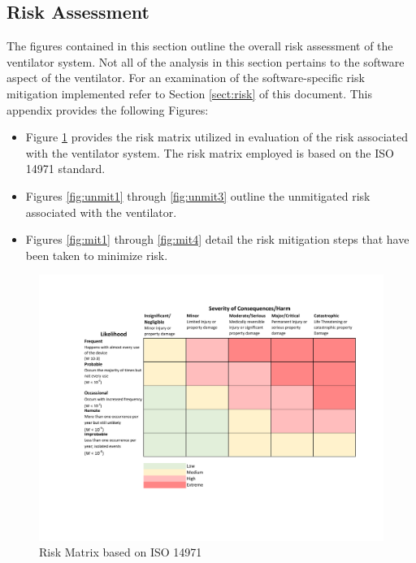 \documentclass[]{article}
\begin{document}
\begin{appendices}
\clearpage
\section{Risk Assessment}
The figures contained in this section outline the overall risk assessment of the ventilator system. Not all of the analysis in this section pertains to the software aspect of the ventilator.  For an examination of the software-specific risk mitigation implemented refer to Section \ref{sect:risk} of this document.
This appendix provides the following Figures:
\begin{itemize}
	\item Figure \ref{fig:risk_matrix} provides the risk matrix utilized in evaluation of the risk associated with the ventilator system.  The risk matrix employed is based on the ISO 14971 standard.
	\item Figures \ref{fig:unmit1} through \ref{fig:unmit3} outline the unmitigated risk associated with the ventilator.
	\item Figures \ref{fig:mit1} through \ref{fig:mit4} detail the risk mitigation steps that have been taken to minimize risk.
\end{itemize}

\begin{figure}
	\includegraphics[scale= 0.9, trim=80 100 40 60, clip]{figures/risk_matrix.pdf}
	\caption{Risk Matrix based on ISO 14971 }
	\label{fig:risk_matrix}
\end{figure}


\end{appendices}
\end{document}
